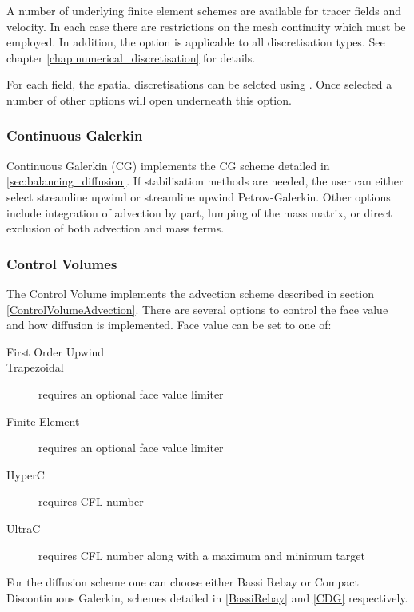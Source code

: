 A number of underlying finite element schemes are available for tracer
fields and velocity. In each case there are restrictions on the mesh
continuity which must be employed. In addition, the \onlypdf\linebreak
{} option is applicable to all discretisation
types. See chapter \ref{chap:numerical_discretisation} for details.

For each field, the spatial discretisations can be selcted using
.  Once selected a number
of other options will open underneath this option.

\subsubsection{Continuous Galerkin}
\label{sect:configuring_fluidity_continuous_galerkin}

Continuous Galerkin (CG) implements the CG scheme detailed in \ref{sec:balancing_diffusion}. If stabilisation methods are needed, the user can either select streamline upwind or streamline upwind Petrov-Galerkin. Other options include integration of advection by part, lumping of the mass matrix, or direct exclusion of both advection and mass terms.

\subsubsection{Control Volumes}\label{Sect:CVs}

The Control Volume implements the advection scheme described in section \ref{ControlVolumeAdvection}. There are 
several options to control the face value and how diffusion is implemented. Face value can be set to one of:
\begin{description}
\item[First Order Upwind]
\item[Trapezoidal] requires an optional face value limiter
\item[Finite Element] requires an optional face value limiter
\item[HyperC] requires CFL number
\item[UltraC] requires CFL number along with a maximum and minimum target
\end{description}

For the diffusion scheme one can choose either Bassi Rebay or Compact Discontinuous Galerkin, schemes detailed in \ref{BassiRebay} and \ref{CDG} respectively.

